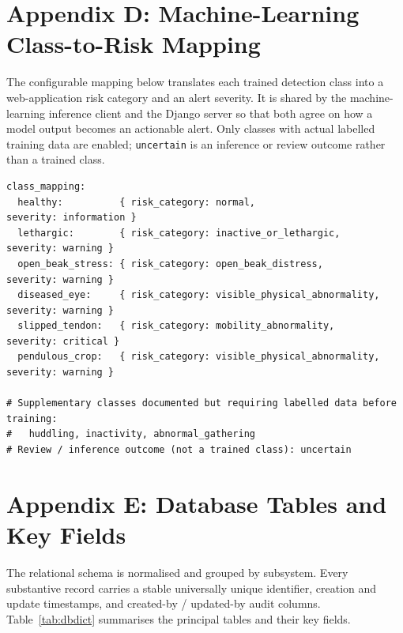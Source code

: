 \documentclass[12pt,a4paper]{report}
\begin{document}
\chapter*{Appendix D: Machine-Learning Class-to-Risk Mapping}

The configurable mapping below translates each trained detection class into a web-application risk category and an alert severity. It is shared by the machine-learning inference client and the Django server so that both agree on how a model output becomes an actionable alert. Only classes with actual labelled training data are enabled; \texttt{uncertain} is an inference or review outcome rather than a trained class.

\begin{lstlisting}[basicstyle=\scriptsize\ttfamily,breaklines=true,frame=single,columns=fullflexible,xleftmargin=0.3cm]
class_mapping:
  healthy:          { risk_category: normal,                      severity: information }
  lethargic:        { risk_category: inactive_or_lethargic,       severity: warning }
  open_beak_stress: { risk_category: open_beak_distress,          severity: warning }
  diseased_eye:     { risk_category: visible_physical_abnormality, severity: warning }
  slipped_tendon:   { risk_category: mobility_abnormality,        severity: critical }
  pendulous_crop:   { risk_category: visible_physical_abnormality, severity: warning }

# Supplementary classes documented but requiring labelled data before training:
#   huddling, inactivity, abnormal_gathering
# Review / inference outcome (not a trained class): uncertain
\end{lstlisting}

\clearpage


\setcounter{table}{0}
\setcounter{figure}{0}
\renewcommand{\thetable}{E.\arabic{table}}
\renewcommand{\thefigure}{E.\arabic{figure}}
\chapter*{Appendix E: Database Tables and Key Fields}

The relational schema is normalised and grouped by subsystem. Every substantive record carries a stable universally unique identifier, creation and update timestamps, and created-by / updated-by audit columns. Table~\ref{tab:dbdict} summarises the principal tables and their key fields.
\end{document}
